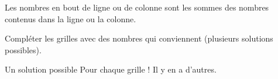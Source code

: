 \numeroteEnigme
\begin{enigme}[Yohaku]
    Les nombres en bout de ligne ou de colonne sont les sommes des nombres contenus dans la ligne ou la colonne.

    Compléter les grilles avec des nombres qui conviennent (plusieurs solutions possibles).

    \hfill
    \hfill
\end{enigme}

\addtocounter{exercice}{-1}
\begin{corrige}
    Un solution possible Pour chaque grille ! Il y en a d'autres.

    \medskip
    \hfill
    \hfill

\end{corrige}